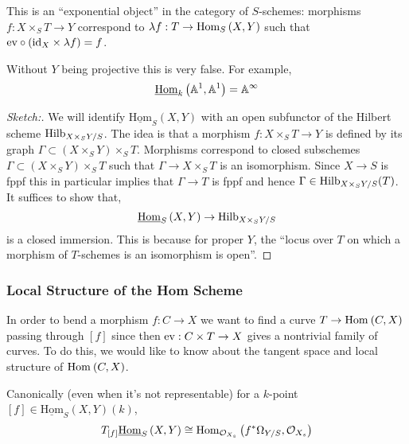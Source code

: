 \documentclass[12pt]{article}
\newcommand{\uHom}[3]{\underline{\mathrm{Hom}}_{#1}\left(#2, #3\right)}
\begin{document}
\begin{rmk}
This is an ``exponential object'' in the category of $S$-schemes: morphisms $f : X \times_S T \to Y$ correspond to $\lambda f : T \to \mathrm{Hom}_{S} \left( X, Y \right)$ such that $\mathrm{ev} \circ (\mathrm{id}_X \times \lambda f) = f$. 
\end{rmk}

\begin{rmk}
Without $Y$ being projective this is very false. For example,
\[ \uHom{k}{\A^1}{\A^1} = \A^{\infty} \]
\end{rmk}


\begin{proof}[Sketch:]
We will identify $\uHom{S}{X}{Y}$ with an open subfunctor of the Hilbert scheme $\mathrm{Hilb}_{X \times_S Y / S}$. The idea is that a morphism $f : X \times_S T \to Y$ is defined by its graph $\Gamma \subset (X \times_S Y) \times_S T$. Morphisms correspond to closed subschemes $\Gamma \subset (X \times_S Y) \times_S T$ such that $\Gamma \to X \times_S T$ is an isomorphism. Since $X \to S$ is fppf this in particular implies that $\Gamma \to T$ is fppf and hence $\Gamma \in \mathrm{Hilb}_{X \times_S Y / S}(T)$. It suffices to show that,
\[ \uHom{S}{X}{Y} \to \Hilb_{X \times_S Y/S} \]
is a closed immersion. This is because for proper $Y$, the ``locus over $T$ on which a morphism of $T$-schemes is an isomorphism is open''. 
\end{proof}

\subsubsection{Local Structure of the Hom Scheme}

\begin{rmk}
In order to bend a morphism $f : C \to X$ we want to find a curve $T \to \mathrm{Hom}_{} \left( C, X \right)$ passing through $[f]$ since then $\mathrm{ev} : C \times T \to X$ gives a nontrivial family of curves. To do this, we would like to know about the tangent space and local structure of $\mathrm{Hom}_{} \left( C, X \right)$.
\end{rmk}

\begin{prop}
Canonically (even when it's not representable) for a $k$-point $[f] \in \uHom{S}{X}{Y}(k)$,
\[ T_{[f]} \uHom{S}{X}{Y} \cong \Hom{\struct{X_s}}{f^* \Omega_{Y/S}}{\struct{X_s}} \]
\end{prop}
\end{document}

